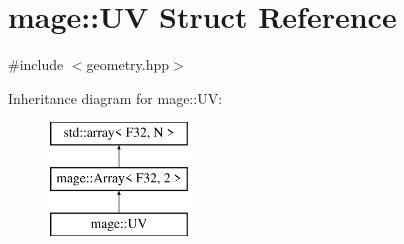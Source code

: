 \hypertarget{structmage_1_1_u_v}{}\section{mage\+:\+:UV Struct Reference}
\label{structmage_1_1_u_v}


{\ttfamily \#include $<$geometry.\+hpp$>$}

Inheritance diagram for mage\+:\+:UV\+:\begin{figure}[H]
\begin{center}
\leavevmode
\includegraphics[height=3.000000cm]{structmage_1_1_u_v}
\end{center}
\end{figure}
